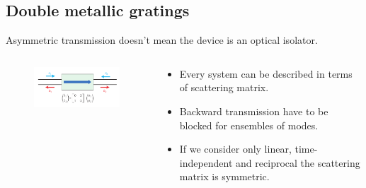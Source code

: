 \documentclass{beamer}
\begin{document}
\subsection{Double metallic gratings}
\begin{frame}
Asymmetric transmission doesn't mean the device is an optical isolator.
	\begin{columns}
	\begin{column}{.5\textwidth}
		\begin{figure}
			\includegraphics[width=\textwidth]{./images/simplest_isolator.png}\\
		\end{figure}
	\end{column}
	\begin{column}{.5\textwidth}
		\begin{itemize}
			\item Every system can be described in terms of scattering matrix.
			\item Backward transmission have to be blocked for ensembles of modes.
			\item If we consider only linear, time-independent and reciprocal the scattering matrix is symmetric.
			
		\end{itemize}
	\end{column}
	\end{columns}

{\tiny \cite{4171512}}
\end{frame}
\end{document}
